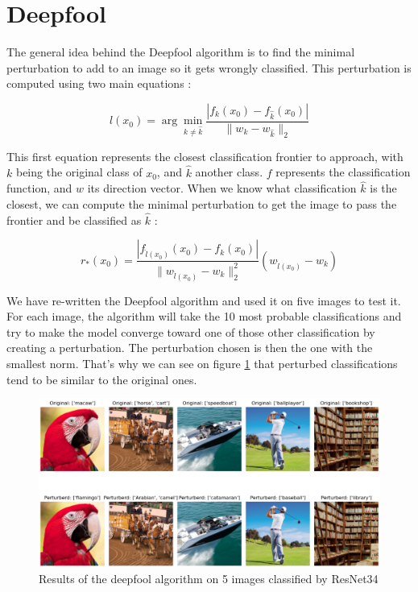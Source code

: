 \documentclass{article}
\begin{document}
\section{Deepfool}

The general idea behind the Deepfool algorithm is to find the minimal perturbation to add to an image so it gets wrongly classified. This perturbation is computed using two main equations :

\begin{equation}
	\hat{l}(x_0) = \arg \min_{k \neq \hat{k}} \frac{|f_{k}(x_0) - f_{\hat{k}}(x_0)|}{\|w_{k} - w_{\hat{k}}\|_2}
\end{equation}

This first equation represents the closest classification frontier to approach, with $k$ being the original class of $x_0$, and $\hat{k}$ another class. $f$ represents the classification function, and $w$ its direction vector. When we know what classification $\hat{k}$ is the closest, we can compute the minimal perturbation to get the image to pass the frontier and be classified as $\hat{k}$ :

\begin{equation}
	r_*(x_0) = \frac{|f_{\hat{l}(x_0)}(x_0) - f_k(x_0)|}{\|w_{\hat{l}(x_0)} - w_k\|_2^2} (w_{\hat{l}(x_0)} - w_k)
\end{equation}

We have re-written the Deepfool algorithm and used it on five images to test it. For each image, the algorithm will take the 10 most probable classifications and try to make the model converge toward one of those other classification by creating a perturbation. The perturbation chosen is then the one with the smallest norm. That's why we can see on figure \ref{fig:result_global_deepfool} that perturbed classifications tend to be similar to the original ones.

\begin{figure}[H]
    \centering
    \includegraphics[width=1\linewidth]{results/result_pert_global.png}
    \caption{Results of the deepfool algorithm on 5 images classified by ResNet34}
    \label{fig:result_global_deepfool}
\end{figure}
\end{document}
